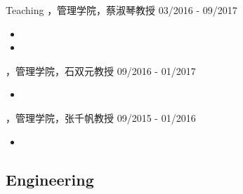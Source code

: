 \begin{xframe}{Teaching}
    \cvexperience
    {，管理学院，蔡淑琴教授}
    {03/2016 - 09/2017}

    \vspace{-2.5mm}

    \begin{itemize}
        \item {}
        \item {}
    \end{itemize}

    \vspace{1.0mm}
    \cvexperience
    {，管理学院，石双元教授}
    {09/2016 - 01/2017}

    \vspace{-2.5mm}

    \begin{itemize}
        \item {}
    \end{itemize}

    \vspace{1.0mm}
    \cvexperience
    {，管理学院，张千帆教授}
    {09/2015 - 01/2016}

    \vspace{-2.5mm}

    \begin{itemize}
        \item {}
    \end{itemize}
\end{xframe}

\subsection{Engineering}

